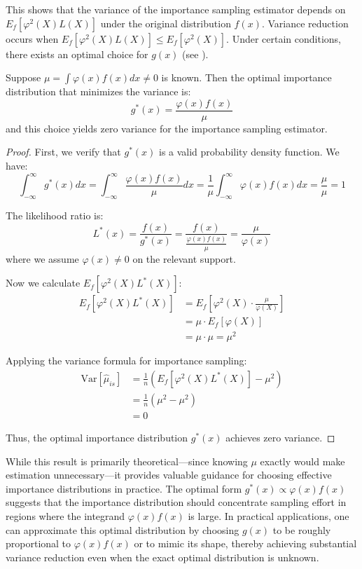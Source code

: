 This shows that the variance of the importance sampling estimator depends on $E_f[\varphi^2(X)L(X)]$ under the original distribution $f(x)$. Variance reduction occurs when $E_f[\varphi^2(X)L(X)] \leq E_f[\varphi^2(X)]$. Under certain conditions, there exists an optimal choice for $g(x)$ (see \cite{lemieux_monte_2009}).

\begin{theoremrep}
Suppose $\mu = \int \varphi(x)f(x)dx \neq 0$ is known. Then the optimal importance distribution that minimizes the variance is:
\begin{equation}
    g^*(x) = \frac{\varphi(x)f(x)}{\mu}
\end{equation}
and this choice yields zero variance for the importance sampling estimator.
\end{theoremrep}

\begin{proof}
First, we verify that $g^*(x)$ is a valid probability density function. We have:
$$\int_{-\infty}^{\infty} g^*(x) dx = \int_{-\infty}^{\infty} \frac{\varphi(x)f(x)}{\mu} dx = \frac{1}{\mu} \int_{-\infty}^{\infty} \varphi(x)f(x) dx = \frac{\mu}{\mu} = 1$$

The likelihood ratio is:
$$L^*(x) = \frac{f(x)}{g^*(x)} = \frac{f(x)}{\frac{\varphi(x)f(x)}{\mu}} = \frac{\mu}{\varphi(x)}$$
where we assume $\varphi(x) \neq 0$ on the relevant support.

Now we calculate $E_f[\varphi^2(X)L^*(X)]$:
\begin{align*}
    E_f[\varphi^2(X)L^*(X)] 
    &= E_f \left[ \varphi^2(X) \cdot \frac{\mu}{\varphi(X)} \right] \\
    &= \mu \cdot E_f[\varphi(X)] \\
    &= \mu \cdot \mu = \mu^2
\end{align*}

Applying the variance formula for importance sampling:
\begin{align*}
    \text{Var}[\hat{\mu}_{is}] 
    &= \frac{1}{n}\left(E_f[\varphi^2(X)L^*(X)] - \mu^2\right) \\
    &= \frac{1}{n} \left(\mu^2 - \mu^2\right) \\
    &= 0
\end{align*}

Thus, the optimal importance distribution $g^*(x)$ achieves zero variance.
\end{proof}

While this result is primarily theoretical—since knowing $\mu$ exactly would make estimation unnecessary—it provides valuable guidance for choosing effective importance distributions in practice. The optimal form $g^*(x) \propto \varphi(x)f(x)$ suggests that the importance distribution should concentrate sampling effort in regions where the integrand $\varphi(x)f(x)$ is large. In practical applications, one can approximate this optimal distribution by choosing $g(x)$ to be roughly proportional to $\varphi(x)f(x)$ or to mimic its shape, thereby achieving substantial variance reduction even when the exact optimal distribution is unknown.



